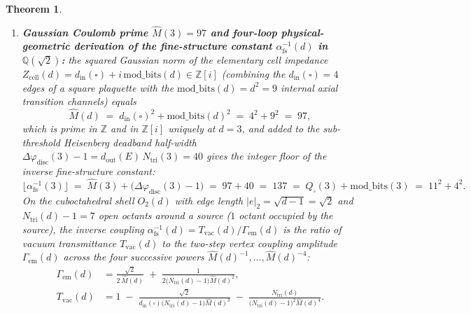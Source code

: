 \documentclass[11pt,a4paper]{article}
\theoremstyle{plain}
\newtheorem{theorem}{Theorem}[section]
\theoremstyle{definition}
\begin{document}
\begin{theorem}
\begin{enumerate}[label=\textbf{(\arabic*)},leftmargin=*]
\item \textbf{Gaussian Coulomb prime $\widehat{M}(3) = 97$ and four-loop physical-geometric derivation of the fine-structure constant $\alpha_{\mathrm{fs}}^{-1}(d)$ in $\mathbb{Q}(\sqrt{2})$:}
  the squared Gaussian norm of the elementary cell impedance $Z_{\mathrm{cell}}(d) = d_{\mathrm{in}}(\square) + i\,\mathrm{mod\_bits}(d) \in \mathbb{Z}[i]$ (combining the $d_{\mathrm{in}}(\square) = 4$ edges of a square plaquette with the $\mathrm{mod\_bits}(d) = d^2 = 9$ internal axial transition channels) equals
  \begin{equation}
    \label{eq:mhat-97-def}
    \widehat{M}(d) \;=\; d_{\mathrm{in}}(\square)^2 + \mathrm{mod\_bits}(d)^2 \;=\; 4^2 + 9^2 \;=\; 97,
  \end{equation}
  which is prime in $\mathbb{Z}$ and in $\mathbb{Z}[i]$ uniquely at $d = 3$, and added to the sub-threshold Heisenberg deadband half-width $\Delta\varphi_{\mathrm{disc}}(3) - 1 = d_{\mathrm{out}}(E)\,N_{\mathrm{tri}}(3) = 40$ gives the integer floor of the inverse fine-structure constant:
  \begin{equation}
    \label{eq:alpha-floor-137}
    \bigl\lfloor\alpha_{\mathrm{fs}}^{-1}(3)\bigr\rfloor \;=\; \widehat{M}(3) + \bigl(\Delta\varphi_{\mathrm{disc}}(3) - 1\bigr) \;=\; 97 + 40 \;=\; 137 \;=\; Q_\square(3) + \mathrm{mod\_bits}(3) \;=\; 11^2 + 4^2.
  \end{equation}
  On the cuboctahedral shell $O_2(d)$ with edge length $|e|_2 = \sqrt{d-1} = \sqrt{2}$ and $N_{\mathrm{tri}}(d) - 1 = 7$ open octants around a source ($1$ octant occupied by the source), the inverse coupling $\alpha_{\mathrm{fs}}^{-1}(d) = T_{\mathrm{vac}}(d) / \Gamma_{\mathrm{em}}(d)$ is the ratio of vacuum transmittance $T_{\mathrm{vac}}(d)$ to the two-step vertex coupling amplitude $\Gamma_{\mathrm{em}}(d)$ across the four successive powers $\widehat{M}(d)^{-1}, \dots, \widehat{M}(d)^{-4}$:
  \begin{align}
    \Gamma_{\mathrm{em}}(d) &= \frac{\sqrt{2}}{2\,\widehat{M}(d)} \;+\; \frac{1}{2\bigl(N_{\mathrm{tri}}(d) - 1\bigr)\widehat{M}(d)^2}, \label{eq:alpha-gamma-denom} \\
    T_{\mathrm{vac}}(d) &= 1 \;-\; \frac{\sqrt{2}}{d_{\mathrm{in}}(\square)\bigl(N_{\mathrm{tri}}(d) - 1\bigr)\widehat{M}(d)^3} \;-\; \frac{N_{\mathrm{tri}}(d)}{\bigl(N_{\mathrm{tri}}(d) - 1\bigr)^2\widehat{M}(d)^4}. \label{eq:alpha-tvac-numer}
  \end{align}

\end{enumerate}
\end{theorem}
\end{document}
